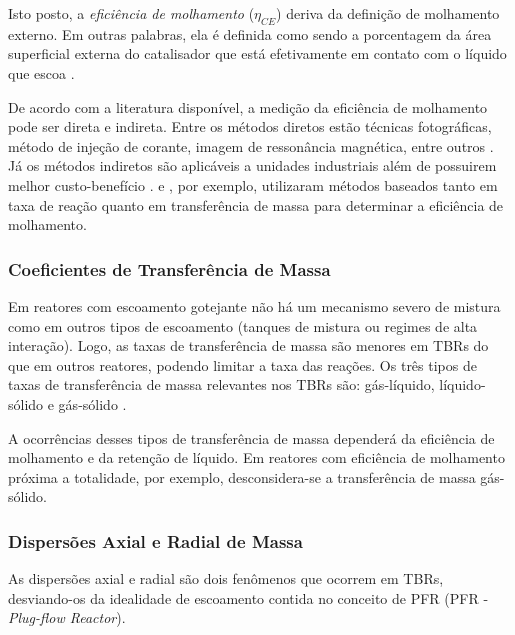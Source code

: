 Isto posto, a \emph{eficiência de molhamento} ($\eta_{CE}$) deriva da definição
de molhamento externo. Em outras palabras, ela é definida como sendo a
porcentagem da área superficial externa do catalisador que está efetivamente em
contato com o líquido que escoa \cite{Schwartz1976}.

De acordo com a literatura disponível, a medição da eficiência de molhamento
pode ser direta e indireta. Entre os métodos diretos estão técnicas
fotográficas, método de injeção de corante, imagem de ressonância magnética,
entre outros . Já os métodos indiretos são
aplicáveis a unidades industriais além de possuirem melhor custo-benefício
\cite{Ranade2011}.  e , por
exemplo, utilizaram métodos baseados tanto em taxa de reação quanto em
transferência de massa para determinar a eficiência de molhamento.


\subsubsection{Coeficientes de Transferência de Massa}
\label{sec:coeficientes}

Em reatores com escoamento gotejante não há um mecanismo severo de mistura como
em outros tipos de escoamento (tanques de mistura ou regimes de alta interação).
Logo, as taxas de transferência de massa são menores em TBRs do que em outros
reatores, podendo limitar a taxa das reações. Os três tipos de taxas de
transferência de massa relevantes nos TBRs são: gás-líquido, líquido-sólido e
gás-sólido \cite{Ranade2011}.

A ocorrências desses tipos de transferência de massa dependerá da eficiência de
molhamento e da retenção de líquido. Em reatores com eficiência de molhamento
próxima a totalidade, por exemplo, desconsidera-se a transferência de massa
gás-sólido.

\subsubsection{Dispersões Axial e Radial de Massa}
\label{sec:dispersoes}

As dispersões axial e radial são dois fenômenos que ocorrem em TBRs,
desviando-os da idealidade de escoamento contida no conceito de PFR (PFR -
\emph{Plug-flow Reactor}).


